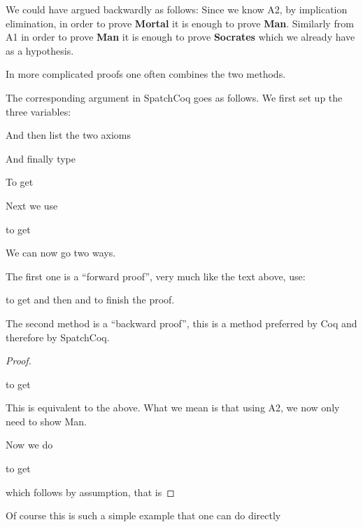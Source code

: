 \begin{itemize}
We could have argued backwardly as follows: Since we know A2, by implication elimination, in order to prove {\bf Mortal} it is enough to prove {\bf Man}. Similarly from A1 in order to prove {\bf Man} it is enough to prove {\bf Socrates} which we already have as a hypothesis.

In more complicated proofs one often combines the two methods.



The corresponding argument in SpatchCoq goes as follows. We first set up the three variables:


And then list the two axioms


And finally type

To get

Next we use

to get


We can now go two ways. 

The first one is a ``forward proof'', very much like the text above, use:

to get
and then 
and 
to finish the proof.

The second method is a ``backward proof'', this is a method preferred by Coq and therefore by SpatchCoq.
\begin{proof}\label{backward Socrates}
 
 
 to get

This is equivalent to the above. What we mean is that using A2, we now only need to show Man.

Now we do
 
 to get
 
 which follows by assumption, that is
 
 \end{proof}
 Of course this is such a simple example that one can do directly 
 

\end{itemize}
